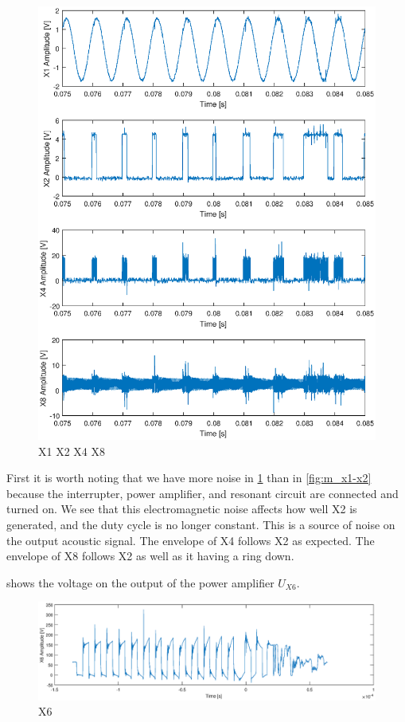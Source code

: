 \begin{figure}[H]
    \centering
    \includegraphics[trim={1cm 0cm 1cm 0cm},clip,width=\textwidth]{img/X1-X2-X4-X8.eps}
    \caption{X1 X2 X4 X8}
    \label{fig:m_x1-x2-x4-x8}
\end{figure}

First it is worth noting that we have more noise in \cref{fig:m_x1-x2-x4-x8} than in \cref{fig:m_x1-x2} because the interrupter, power amplifier, and resonant circuit are connected and turned on. We see that this electromagnetic noise affects how well X2 is generated, and the duty cycle is no longer constant. This is a source of noise on the output acoustic signal. The envelope of X4 follows X2 as expected. The envelope of X8 follows X2 as well as it having a ring down.

 shows the voltage on the output of the power amplifier $U_{X6}$.

\begin{figure}[H]
    \centering
    \includegraphics[trim={3.2cm 0cm 3.2cm 0cm},clip,width=\textwidth]{img/X6singlepulse.eps}
    \caption{X6}
    \label{fig:m_x6}
\end{figure}

